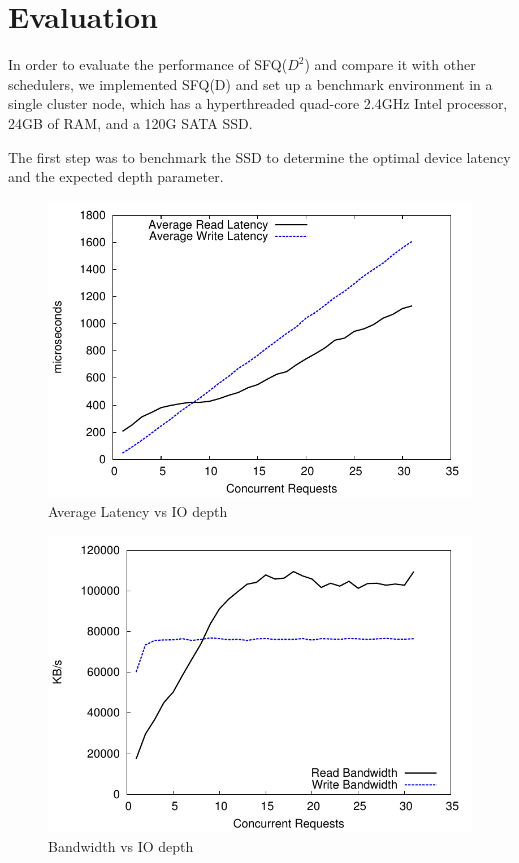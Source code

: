 \section{Evaluation}

In order to evaluate the performance of SFQ($D^2$) and compare it with
other schedulers, we implemented SFQ(D) and set up a benchmark
environment in a single cluster node, which has a hyperthreaded
quad-core 2.4GHz Intel processor, 24GB of RAM, and a 120G SATA SSD. 

The first step was to benchmark the SSD to determine the optimal
device latency and the expected depth parameter. 

\begin{figure}[t]
  \centering \includegraphics[width=\linewidth]{../../graphs/noop/latency_motivation.pdf}
  \caption{Average Latency vs IO depth}
  \label{fig:latMot}
\end{figure} 

\begin{figure}[t]
  \centering \includegraphics[width=\linewidth]{../../graphs/noop/bandwidth_motivation.pdf}
  \caption{Bandwidth vs IO depth}
  \label{fig:bandMot}
\end{figure}

